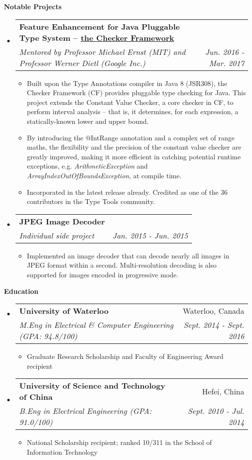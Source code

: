\documentclass[letterpaper,10pt]{article}
\makeatletter
\newcommand{\resitem}[1]{\item #1 \vspace{-2pt}}
\newcommand{\resheading}[1]{{\large \colorbox{mygrey}{\begin{minipage}{\textwidth}{\textbf{#1 \vphantom{p\^{E}}}}\end{minipage}}}}
\newcommand{\ressubheading}[4]{
\begin{tabular*}{7.0in}{l@{\extracolsep{\fill}}r}
		\textbf{#1} & #2 \\
		\textit{#3} & \textit{#4} \\
\end{tabular*}\vspace{-6pt}}
\makeatother
\begin{document}
\resheading{Notable Projects}
\begin{itemize}
\itemsep0em
\item
	\ressubheading{Feature Enhancement for Java Pluggable Type System -- \href{https://github.com/typetools/checker-framework}{the Checker Framework}}{}{Mentored by Professor Michael Ernst (MIT) and Professor Werner Dietl (Google Inc.)}{Jun. 2016 - Mar. 2017}
	\begin{itemize}
        \resitem{Built upon the Type Annotations compiler in Java 8 (JSR308), the Checker Framework (CF) provides pluggable type checking for Java. This project extends the Constant Value Checker, a core checker in CF, to perform interval analysis -- that is, it determines, for each expression, a statically-known lower and upper bound.}
        \resitem{By introducing the @IntRange annotation and a complex set of range maths, the flexibility and the precision of the constant value checker are greatly improved, making it more efficient in catching potential runtime exceptions, e.g. \textit{ArithmeticException} and \textit{ArrayIndexOutOfBoundsException}, at compile time.}
        \resitem{Incorporated in the latest release already. Credited as one of the 36 contributors in the Type Tools community.}
	\end{itemize}
\item
	\ressubheading{JPEG Image Decoder}{}{Individual side project}{Jan. 2015 - Jun. 2015}
	\begin{itemize}
		\resitem{Implemented an image decoder that can decode nearly all images in JPEG format within a second. Multi-resolution decoding is also supported for images encoded in progressive mode.}
	\end{itemize}
	
\end{itemize}

\resheading{Education}
\begin{itemize}
\itemsep0em
\item
	\ressubheading{University of Waterloo}{Waterloo, Canada}{M.Eng in Electrical \& Computer Engineering (GPA: 94.8/100)}{Sept. 2014 - Sept. 2016}
	\begin{itemize}
        \resitem{Graduate Research Scholarship and Faculty of Engineering Award recipient}
	\end{itemize}
\item
	\ressubheading{University of Science and Technology of China}{Hefei, China}{B.Eng in Electrical Engineering (GPA: 91.0/100)}{Sept. 2010 - Jul. 2014}
	\begin{itemize}
        \resitem{ National Scholarship recipient; ranked 10/311 in the School of Information Technology}
	\end{itemize}

\end{itemize}
\end{document}
